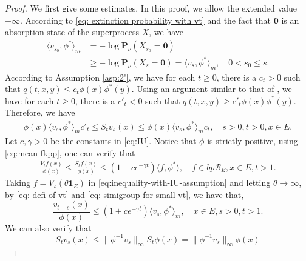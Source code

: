 \documentclass[UTF8]{pkuthss}
\theoremstyle{plain}
\theoremstyle{definition}
\numberwithin{equation}{section}
\begin{document}
\begin{proof}
We first give some estimates. In this proof, we allow the extended value $+\infty$.
	According to \eqref{eq: extinction probability with vt} and the fact that $\mathbf 0$ is an absorption state of the superprocess $X$, we have
\begin{equation}\label{eq:assertion1}
\begin{split}
	\langle v_{s_0},\phi^* \rangle_m
	&= -\log \mathbf P_\nu ( X_{s_0} = \mathbf 0 )\\
	& \geq -\log \mathbf P_\nu ( X_s = \mathbf 0 )
	= \langle v_s,\phi^* \rangle_m,
	\quad 0 < s_0\leq s.
\end{split}\end{equation}
	According to Assumption \ref{asp:2'}, we have for each $t\geq 0$, there is a $c_t>0$ such that $q(t,x,y)\leq c_t \phi(x)\phi^*(y)$. 
 Using an argument similar to that of \cite[Proposition 2.5]{KimSong2008Intrinsic}, 
	we have for each $t\geq 0$, there is a $c'_t < 0$ such that $q(t,x,y) \geq c'_t \phi(x)\phi^*(y)$.
	Therefore, we have
\begin{equation}\label{eq:assertion2}\begin{split}
	\phi(x) \langle v_s , \phi^* \rangle_m c'_t
\leq S_t v_s(x) \leq \phi(x) \langle v_s , \phi^* \rangle_m c_t,
	\quad s>0,t>0,x\in E.
\end{split}\end{equation}
	Let $c,\gamma > 0$ be the constants in \eqref{eq:IU}. 
	Notice that $\phi$ is strictly positive, using \eqref{eq:mean-fkpp}, one can verify that
\begin{equation}\label{eq:inequality-with-IU-assumption}\begin{split}
	\frac{V_t f(x)}{\phi(x)}
	\leq \frac{S_t f(x)}{\phi(x)}
	\leq (1+ ce^{-\gamma t}) \langle f,\phi^*\rangle,
	\quad f\in bp\mathscr B_E,x\in E,t>1.
\end{split}\end{equation}
	Taking $f = V_s(\theta \mathbf 1_E)$ in \eqref{eq:inequality-with-IU-assumption} and letting $\theta \to \infty$,
	by \eqref{eq: defi of vt} and \eqref{eq: simigroup for small vt},
	we have that,
\begin{equation}\label{eq:assertion3}
	\frac{v_{t+s}(x)}{\phi(x)}
	\leq (1+ ce^{-\gamma t}) \langle v_s,\phi^*\rangle_m,
	\quad x\in E,s>0,t>1.
\end{equation}
	We can also verify that
\begin{equation}\label{eq:assertion4}
	S_t v_s(x)
	\leq \|\phi^{-1}v_s\|_\infty  S_t \phi(x)
	= \|\phi^{-1}v_s\|_\infty \phi(x)

\end{equation}
\end{proof}
\end{document}
